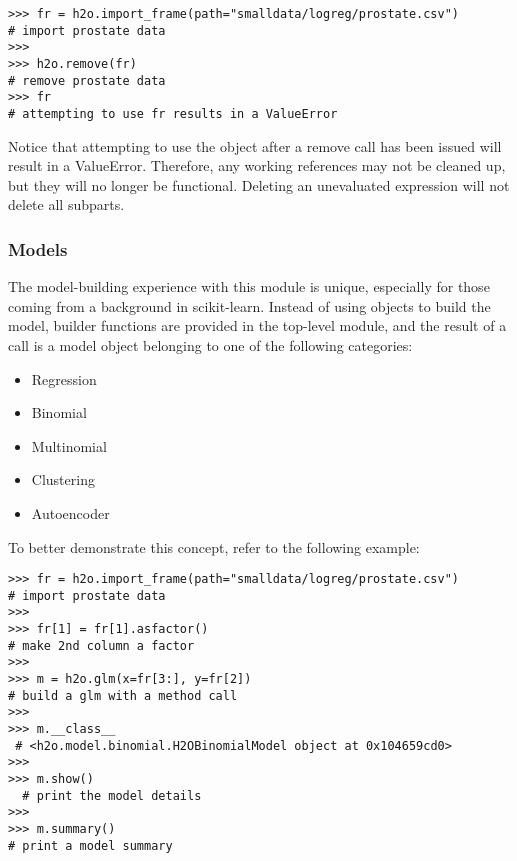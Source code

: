 \begin{lstlisting}[style=python]
>>> fr = h2o.import_frame(path="smalldata/logreg/prostate.csv")  
# import prostate data
>>>
>>> h2o.remove(fr)                                               
# remove prostate data
>>> fr                                                           
# attempting to use fr results in a ValueError
\end{lstlisting}

Notice that attempting to use the object after a remove call has been issued will result in a ValueError. Therefore, any working references may not be cleaned up, but they will no longer be functional. Deleting an unevaluated expression will not delete all subparts.

\subsubsection{Models}

The model-building experience with this module is unique, especially for those coming from a background in scikit-learn. Instead of using objects to build the model, builder functions are provided in the top-level module, and the result of a call is a model object belonging to one of the following categories:

\begin{itemize}
\item Regression
\item Binomial
\item Multinomial
\item Clustering
\item Autoencoder
\end{itemize}

To better demonstrate this concept, refer to the following example:
\begin{lstlisting}[style=python]
>>> fr = h2o.import_frame(path="smalldata/logreg/prostate.csv")  
# import prostate data
>>>
>>> fr[1] = fr[1].asfactor()                                     
# make 2nd column a factor
>>>
>>> m = h2o.glm(x=fr[3:], y=fr[2])                               
# build a glm with a method call
>>>
>>> m.__class__                                                 
 # <h2o.model.binomial.H2OBinomialModel object at 0x104659cd0>
>>>
>>> m.show()                                                   
  # print the model details
>>>
>>> m.summary()                                                  
# print a model summary
\end{lstlisting}


